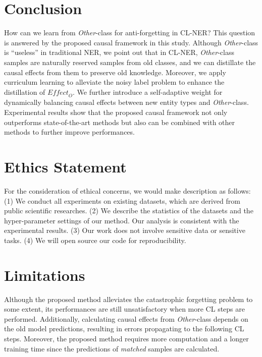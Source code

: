 \documentclass[11pt]{article}
\begin{document}
\section{Conclusion}
How can we learn from \textit{Other}-class for anti-forgetting in CL-NER?
This question is answered by the proposed causal framework in this study.
Although \textit{Other}-class is ``useless'' in traditional NER, we point out that in CL-NER, \textit{Other}-class samples are naturally reserved samples from old classes, and we can distillate the causal effects from them to preserve old knowledge.
Moreover, we apply curriculum learning to alleviate the noisy label problem to enhance the distillation of $\textit{Effect}_O$.
We further introduce a self-adaptive weight for dynamically balancing causal effects between new entity types and \textit{Other}-class.
Experimental results show that the proposed causal framework not only outperforms state-of-the-art methods but also can be combined with other methods to further improve performances.

\section*{Ethics Statement}
For the consideration of ethical concerns, we would make description as follows:
(1) We conduct all experiments on existing datasets, which are derived from public scientific researches.
(2) We describe the statistics of the datasets and the hyper-parameter settings of our method. Our analysis is consistent with the experimental results.
(3) Our work does not involve sensitive data or sensitive tasks.
(4) We will open source our code for reproducibility.

\section*{Limitations}
Although the proposed method alleviates the catastrophic forgetting problem to some extent, its performances are still unsatisfactory when more CL steps are performed.
Additionally, calculating causal effects from \textit{Other}-class depends on the old model predictions, resulting in errors propagating to the following CL steps.
Moreover, the proposed method requires more computation and a longer training time since the predictions of \textit{matched} samples are calculated.






\appendix
\end{document}
